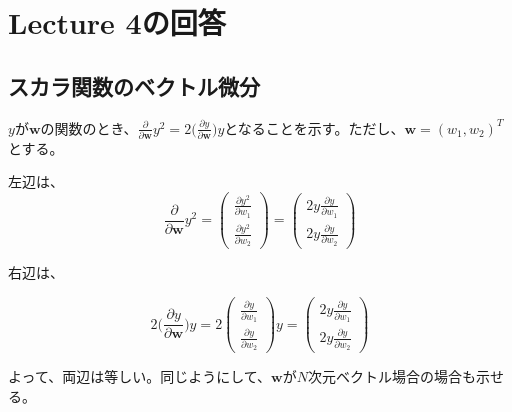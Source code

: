 \section*{Lecture 4の回答}

\subsection*{スカラ関数のベクトル微分}

$y$が$\mathbf{w}$の関数のとき、$\frac{\partial}{ \partial \mathbf{w}} y^2 = 2 \bigg( \frac{\partial y }{ \partial \mathbf{w} } \bigg)y$となることを示す。ただし、$\mathbf{w} = (w_1, w_2)^T$とする。

左辺は、
\begin{equation*}
\frac{\partial}{\partial \mathbf{w}} y^2 = \begin{pmatrix}
	\frac{\partial y^2}{\partial w_1} \\
	\frac{\partial y^2}{\partial w_2}   
\end{pmatrix} = \begin{pmatrix}
	2y\frac{\partial y}{\partial w_1} \\
	2y\frac{\partial y}{\partial w_2}   
\end{pmatrix}		
\end{equation*}

右辺は、

\begin{equation*}
2 \bigg( \frac{\partial y }{ \partial \mathbf{w} } \bigg)y =  
2\begin{pmatrix}
	\frac{\partial y}{\partial w_1} \\
	\frac{\partial y}{\partial w_2}   
\end{pmatrix}y = \begin{pmatrix}
	2y\frac{\partial y}{\partial w_1} \\
	2y\frac{\partial y}{\partial w_2}   
\end{pmatrix}		
\end{equation*}


よって、両辺は等しい。同じようにして、$\mathbf{w}$が$N$次元ベクトル場合の場合も示せる。
